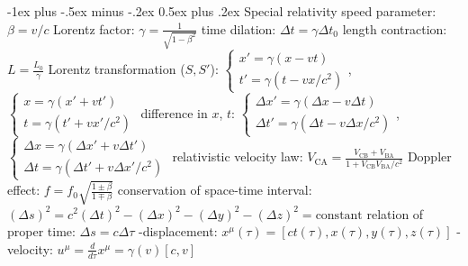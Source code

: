 \documentclass[10pt,landscape]{article}
\makeatletter
\renewcommand{\subsection}{\@startsection{subsection}{2}{0mm}%
                                {-1ex plus -.5ex minus -.2ex}%
                                {0.5ex plus .2ex}%
                                {\normalfont\normalsize\bfseries}}
\newcommand{\spc}{\hspace*{1em}}
\makeatother
\begin{document}
\begin{multicols*}{3}
\subsection{Special relativity}
speed parameter: $\beta =v/c$
\newline
Lorentz factor: $\gamma =\frac{1}{\sqrt{1-\beta ^2}}$
\newline
time dilation: $\Delta t =\gamma \Delta t _0$
\newline
length contraction: $L=\frac{L_0}{\gamma }$
\newline \newline
Lorentz transformation ($S,S'$):
\newline
\spc $\left\{\begin{array}{l}
x'=\gamma (x-vt) \\ t'=\gamma (t-vx/c^2)
\end{array}\right.$, $\left\{\begin{array}{l}
x=\gamma (x'+vt')\\ t=\gamma (t'+vx'/c^2)
\end{array}\right.$
\newline
difference in $x$, $t$:
\newline
\spc $\left\{\begin{array}{l}
\Delta x'=\gamma (\Delta x-v\Delta t)\\ \Delta t'=\gamma (\Delta t-v\Delta x/c^2)
\end{array}\right.$, $\left\{\begin{array}{l}
\Delta x=\gamma (\Delta x'+v\Delta t') \\ \Delta t=\gamma (\Delta t'+v\Delta x'/c^2)
\end{array}\right.$
\newline
relativistic velocity law: $V_{\textrm{CA}}=\frac{V_{\textrm{CB}}+V_{\textrm{BA}}}{1+V_{\textrm{CB}}V_{\textrm{BA}}/c^2}$
\newline
Doppler effect: $f=f_0\sqrt{\frac{1\pm \beta }{1\mp \beta }}$
\newline \newline
conservation of space-time interval: 
\newline
\spc $(\Delta s)^2=c^2(\Delta t)^2-(\Delta x)^2-(\Delta y)^2-(\Delta z)^2=\textrm{constant}$
\newline
relation of proper time: $\Delta s=c\Delta \tau$
-displacement: $x^{\mu}(\tau)=[ct(\tau),x(\tau),y(\tau),z(\tau)]$
-velocity: $u^{\mu}=\frac{d}{d\tau}x^{\mu}=\gamma(v)[c,v]$

\end{multicols*}
\end{document}
